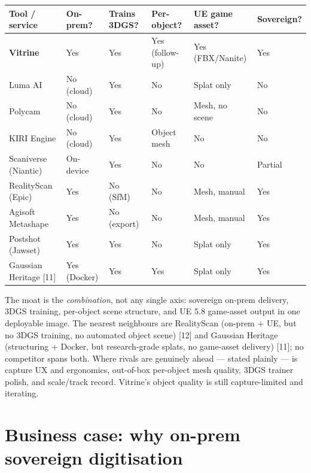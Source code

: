 \documentclass[a4paper,11pt]{article}
\begin{document}
\begin{center}\small
\begin{tabularx}{\textwidth}{@{}L{3.0cm} C{1.9cm} C{1.9cm} C{1.9cm} C{2.1cm} C{1.6cm}@{}}
\toprule
\textbf{Tool / service} & \textbf{On-prem?} & \textbf{Trains 3DGS?} & \textbf{Per-object?} & \textbf{UE game asset?} & \textbf{Sovereign?} \\
\midrule
\textbf{Vitrine}          & Yes         & Yes         & Yes (follow-up) & Yes (FBX/Nanite) & Yes \\
Luma AI                   & No (cloud)  & Yes         & No          & Splat only     & No \\
Polycam                   & No (cloud)  & Yes         & No          & Mesh, no scene & No \\
KIRI Engine               & No (cloud)  & Yes         & Object mesh & No             & No \\
Scaniverse (Niantic)      & On-device   & Yes         & No          & No             & Partial \\
RealityScan (Epic)        & Yes         & No (SfM)    & No          & Mesh, manual   & Yes \\
Agisoft Metashape         & Yes         & No (export) & No          & Mesh, manual   & Yes \\
Postshot (Jawset)         & Yes         & Yes         & No          & Splat only     & Yes \\
Gaussian Heritage [11]    & Yes (Docker)& Yes         & Yes         & Splat only     & Yes \\
\bottomrule
\end{tabularx}
\end{center}

The moat is the \emph{combination}, not any single axis: sovereign on-prem delivery, 3DGS
training, per-object scene structure, and UE 5.8 game-asset output in one deployable image.
The nearest neighbours are RealityScan (on-prem + UE, but no 3DGS training, no automated
object scene) [12] and Gaussian Heritage (structuring + Docker, but research-grade splats, no
game-asset delivery) [11]; no competitor spans both. Where rivals are genuinely ahead ---
stated plainly --- is capture UX and ergonomics, out-of-box per-object mesh quality, 3DGS
trainer polish, and scale/track record. Vitrine's object quality is still capture-limited and
iterating.

\section{Business case: why on-prem sovereign digitisation}
\end{document}
